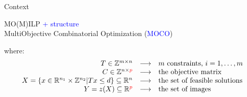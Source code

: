 \documentclass[10pt,xcolor=dvipsnames]{beamer}
\newcommand{\mR}{\mathbb{R}}
\newcommand{\mZ}{\mathbb{Z}}
\newcommand{\red}{\textcolor{red}}
\newcommand{\blue}{\textcolor{blue}}
\begin{document}
\begin{frame}{Context}
\begin{center}
MO(M)ILP \blue{+ structure}\\
MultiObjective Combinatorial Optimization (\blue{MOCO})
\end{center}
\vspace{2mm}
\noindent 
where:
\vspace{-6mm}
$$
\begin{array}{rcl}
T \in \mZ^{m \times n} & \longrightarrow & m \hbox{ constraints, } i = 1,\ldots,m\\
%
C \in \mZ^{n\times \red{p}} & \longrightarrow & \hbox{the objective matrix}\\
%
X=\{x \in \mR^{n_1} \times \mZ^{n_2}| Tx\leq d\}\subseteq\mR^n  & \longrightarrow & \hbox{the set of feasible solutions}\\
Y=z(X)\subseteq \mR^{\red{p}} & \longrightarrow & \hbox{the set of images}\\
\notag
\end{array}
$$


\end{frame}
\end{document}
